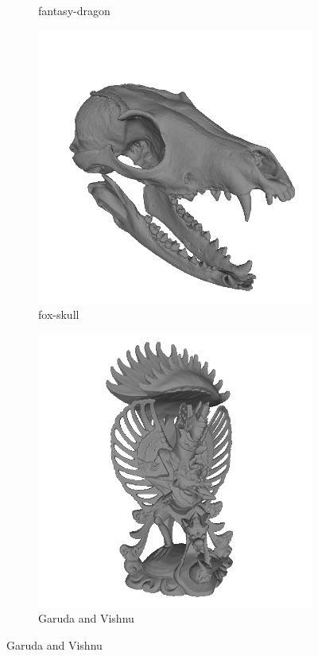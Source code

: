 \begin{figure}[!h]
\begin{subfigure}[b]{0.23\linewidth}
		\caption{fantasy-dragon}
	\end{subfigure}
	\begin{subfigure}[b]{0.23\linewidth}
		\includegraphics[width=\linewidth]{./Figures/train-dataset/18.fox-skull.png}
		\caption{fox-skull}
	\end{subfigure}
	\begin{subfigure}[b]{0.23\linewidth}
		\includegraphics[width=\linewidth]{./Figures/train-dataset/19.garuda-and-vishnu.png}
		\caption{Garuda and Vishnu}
	\end{subfigure}


\end{figure}
